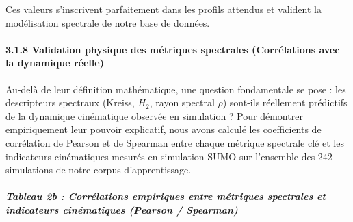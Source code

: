 \documentclass[10pt, a4paper]{article}
\begin{document}
Ces valeurs s'inscrivent parfaitement dans les profils attendus et
valident la modélisation spectrale de notre base de données.

\paragraph{3.1.8 Validation physique des métriques spectrales
(Corrélations avec la dynamique
réelle)}\label{validation-physique-des-muxe9triques-spectrales-corruxe9lations-avec-la-dynamique-ruxe9elle}

Au-delà de leur définition mathématique, une question fondamentale se
pose : les descripteurs spectraux (Kreiss, \(H_2\), rayon spectral
\(\rho\)) sont-ils réellement prédictifs de la dynamique cinématique
observée en simulation ? Pour démontrer empiriquement leur pouvoir
explicatif, nous avons calculé les coefficients de corrélation de
Pearson et de Spearman entre chaque métrique spectrale clé et les
indicateurs cinématiques mesurés en simulation SUMO sur l'ensemble des
242 simulations de notre corpus d'apprentissage.

\subparagraph{Tableau 2b : Corrélations empiriques entre métriques
spectrales et indicateurs cinématiques (Pearson /
Spearman)}\label{tableau-2b-corruxe9lations-empiriques-entre-muxe9triques-spectrales-et-indicateurs-cinuxe9matiques-pearson-spearman}
\end{document}
